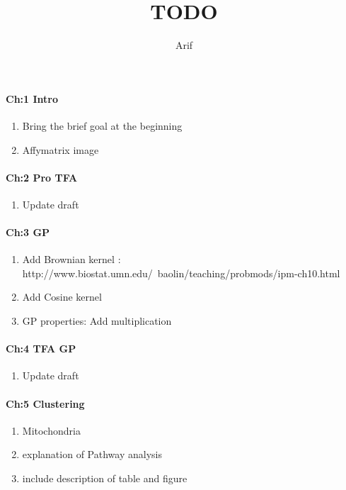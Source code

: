 \documentclass[a4paper,10pt]{article}
\title{TODO}
\author{Arif}
\begin{document}
\maketitle


\paragraph{Ch:1 Intro}
\begin{enumerate}
 \item Bring the brief goal at the beginning 
 \item Affymatrix image
\end{enumerate}

\paragraph{Ch:2 Pro TFA}
\begin{enumerate}
 \item Update draft
\end{enumerate}

\paragraph{Ch:3 GP}
\begin{enumerate}
 \item Add Brownian kernel : http://www.biostat.umn.edu/~baolin/teaching/probmods/ipm-ch10.html
 \item Add Cosine kernel
 \item GP properties: Add multiplication
\end{enumerate}

\paragraph{Ch:4 TFA GP}
\begin{enumerate}
 \item Update draft
\end{enumerate}

\paragraph{Ch:5 Clustering}
\begin{enumerate}
 \item Mitochondria
 \item explanation of Pathway analysis
 \item include description of table and figure
\end{enumerate}
\end{document}

